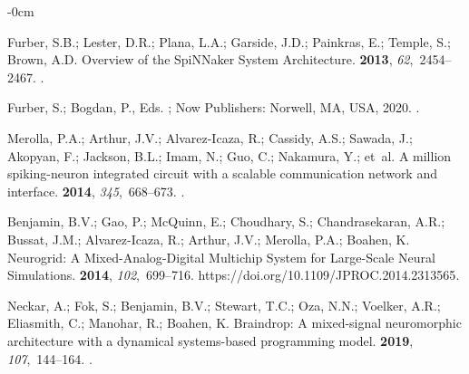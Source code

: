 \documentclass[brainsci, %
               review,accept,pdftex,moreauthors
               ]{Definitions/mdpi}
\begin{document}
\begin{adjustwidth}{-\extralength}{0cm}
\begin{thebibliography}{999}
Furber, S.B.; Lester, D.R.; Plana, L.A.; Garside, J.D.; Painkras, E.; Temple,
  S.; Brown, A.D.
\newblock Overview of the {SpiNNaker} {System} {Architecture}.
 {\bf 2013}, {\em
  62},~2454--2467.
.

Furber, S.; Bogdan, P., Eds.
;
  Now Publishers: {Norwell, MA, USA,} %
  2020.
.

Merolla, P.A.; Arthur, J.V.; Alvarez-Icaza, R.; Cassidy, A.S.; Sawada, J.;
  Akopyan, F.; Jackson, B.L.; Imam, N.; Guo, C.; Nakamura, Y.;  et~al.
\newblock A million spiking-neuron integrated circuit with a scalable
  communication network and interface.
 {\bf 2014}, {\em 345},~668--673.
.

Benjamin, B.V.; Gao, P.; McQuinn, E.; Choudhary, S.; Chandrasekaran, A.R.;
  Bussat, J.M.; Alvarez-Icaza, R.; Arthur, J.V.; Merolla, P.A.; Boahen, K.
\newblock Neurogrid: {A} {Mixed}-{Analog}-{Digital} {Multichip} {System} for
  {Large}-{Scale} {Neural} {Simulations}.
 {\bf 2014}, {\em 102},~699--716.
  {{https://doi.org/10.1109/JPROC.2014.2313565}}.

Neckar, A.; Fok, S.; Benjamin, B.V.; Stewart, T.C.; Oza, N.N.; Voelker, A.R.;
  Eliasmith, C.; Manohar, R.; Boahen, K.
\newblock Braindrop: {A} mixed-signal neuromorphic architecture with a
  dynamical systems-based programming model.
 {\bf 2019}, {\em 107},~144--164.
.


\end{thebibliography}
\end{adjustwidth}
\end{document}
